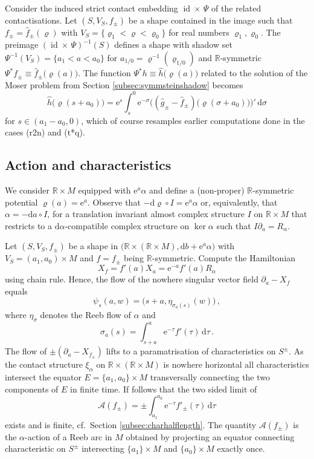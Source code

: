 \documentclass{amsart}
\theoremstyle{definition}
\newcommand{\AAA}{\mathcal A}
\newcommand{\rmd}{\mathrm d}
\newcommand{\rme}{\mathrm e}
\newcommand{\R}{\mathbb R}
\DeclareMathOperator{\id}{\mathrm{id}}
\begin{document}
Consider the induced strict contact embedding
$\id\times\,\Psi$
of the related contactisations.
Let $(S,V_S,f_{\pm})$ be a shape
contained in the image
such that $f_{\pm}=\hat{f}_{\pm}(\varrho)$
with $V_S=\{\varrho_1<\varrho<\varrho_0\}$
for real numbers $\varrho_1,\varrho_0$.
The preimage $(\id\times\,\Psi)^{-1}(S)$
defines a shape with shadow set
$\Psi^{-1}(V_S)=\{a_1<a<a_0\}$
for $a_{1/0}=\varrho^{-1}(\varrho_{1/0})$
and $\R$-symmetric
$\Psi^*f_{\pm}\equiv\hat{f}_{\pm}\big(\varrho(a)\big)$.
The function $\Psi^*h\equiv\hat{h}\big(\varrho(a)\big)$
related to the solution of the Moser problem from
Section \ref{subsec:symmsteinshadow} becomes
  \[
    \hat{h}\big(\varrho(s+a_0)\big)=
    \rme^s
        \int_s^0
          \rme^{-\sigma}
          \Big(
          	(\hat{g}_{\pm}-\hat{f}_{\pm})
		\big(\varrho(\sigma+a_0)\big)\Big)'\,
        \rmd\sigma
  \]
for $s\in(a_1-a_0,0)$,
which of course resamples
earlier computations done in the cases
(r2n) and (t*q).




\subsection{Action and characteristics}
\label{subsec:acandchar}


We consider $\R\times M$
equipped with $\rme^a\alpha$
and define a (non-proper) $\R$-symmetric potential
$\varrho(a)=\rme^a$.
Observe that
$-\rmd\varrho\circ I=\rme^a\alpha$
or, equivalently, that $\alpha=-\rmd a\circ I$,
for a translation invariant almost complex structure
$I$ on $\R\times M$ that restricts to a
$\rmd\alpha$-compatible complex structure
on $\ker\alpha$
such that $I\partial_a=R_{\alpha}$.

Let $(S,V_S,f_{\pm})$ be a shape
in $\big(\R\times(\R\times M),\rmd b+\rme^a\alpha\big)$
with $V_S=(a_1,a_0)\times M$
and $f=f_{\pm}$ being $\R$-symmetric.
Compute the Hamiltonian
\[
X_f=f'(a)X_a=\rme^{-a}f'(a)R_{\alpha}
\]
using chain rule.
Hence,
the flow of the nowhere singular vector field
$\partial_a-X_f$ equals
\[
\psi_s(a,w)=
\big(
s+a,
\eta_{\sigma_a(s)}(w)
\big)
\,,
\]
where $\eta_{\sigma}$
denotes the Reeb flow of $\alpha$
and
\[
\sigma_a(s)=\int_{s+a}^a
        \rme^{-\tau}f'(\tau)\,
        \rmd\tau
\,.
\]
The flow of $\pm(\partial_a-X_{f_{\pm}})$
lifts to a paramatrisation of characteristics
on $S^{\pm}$.
As the contact structure $\xi_{\alpha}$
on $\R\times(\R\times M)$
is nowhere horizontal
all characteristics intersect the equator
$E=\{a_1,a_0\}\times M$ transversally
connecting the two components of $E$
in finite time.
If follows
that the two sided limit of
\[
\AAA(f_{\pm})=
\pm\int_{a_1}^{a_0}
\rme^{-\tau}
f'_{\pm}(\tau)\,
\rmd\tau
\]
exists and is finite,
cf.\ Section \ref{subsec:charhalflength}.
The quantity $\AAA(f_{\pm})$
is the $\alpha$-action
of a Reeb arc in $M$
obtained by projecting
an equator connecting characteristic on $S^{\pm}$
intersecting $\{a_1\}\times M$ and $\{a_0\}\times M$
exactly once.
\end{document}
